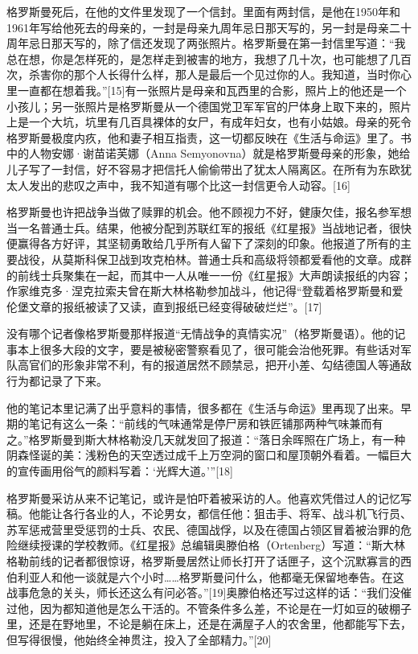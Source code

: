 格罗斯曼死后，在他的文件里发现了一个信封。里面有两封信，是他在1950年和1961年写给他死去的母亲的，一封是母亲九周年忌日那天写的，另一封是母亲二十周年忌日那天写的，除了信还发现了两张照片。格罗斯曼在第一封信里写道：“我总在想，你是怎样死的，是怎样走到被害的地方，我想了几十次，也可能想了几百次，杀害你的那个人长得什么样，那人是最后一个见过你的人。我知道，当时你心里一直都在想着我。”[15]有一张照片是母亲和瓦西里的合影，照片上的他还是一个小孩儿；另一张照片是格罗斯曼从一个德国党卫军军官的尸体身上取下来的，照片上是一个大坑，坑里有几百具裸体的女尸，有成年妇女，也有小姑娘。母亲的死令格罗斯曼极度内疚，他和妻子相互指责，这一切都反映在《生活与命运》里了。书中的人物安娜·谢苗诺芙娜（Anna Semyonovna）就是格罗斯曼母亲的形象，她给儿子写了一封信，好不容易才把信托人偷偷带出了犹太人隔离区。在所有为东欧犹太人发出的悲叹之声中，我不知道有哪个比这一封信更令人动容。[16]

格罗斯曼也许把战争当做了赎罪的机会。他不顾视力不好，健康欠佳，报名参军想当一名普通士兵。结果，他被分配到苏联红军的报纸《红星报》当战地记者，很快便赢得各方好评，其坚韧勇敢给几乎所有人留下了深刻的印象。他报道了所有的主要战役，从莫斯科保卫战到攻克柏林。普通士兵和高级将领都爱看他的文章。成群的前线士兵聚集在一起，而其中一人从唯一一份《红星报》大声朗读报纸的内容；作家维克多·涅克拉索夫曾在斯大林格勒参加战斗，他记得“登载着格罗斯曼和爱伦堡文章的报纸被读了又读，直到报纸已经变得破破烂烂”。[17]

没有哪个记者像格罗斯曼那样报道“无情战争的真情实况”（格罗斯曼语）。他的记事本上很多大段的文字，要是被秘密警察看见了，很可能会治他死罪。有些话对军队高官们的形象非常不利，有的报道居然不顾禁忌，把开小差、勾结德国人等通敌行为都记录了下来。

他的笔记本里记满了出乎意料的事情，很多都在《生活与命运》里再现了出来。早期的笔记有这么一条：“前线的气味通常是停尸房和铁匠铺那两种气味兼而有之。”格罗斯曼到斯大林格勒没几天就发回了报道：“落日余晖照在广场上，有一种阴森怪诞的美：浅粉色的天空透过成千上万空洞的窗口和屋顶朝外看着。一幅巨大的宣传画用俗气的颜料写着：‘光辉大道。’”[18]

格罗斯曼采访从来不记笔记，或许是怕吓着被采访的人。他喜欢凭借过人的记忆写稿。他能让各行各业的人，不论男女，都信任他：狙击手、将军、战斗机飞行员、苏军惩戒营里受惩罚的士兵、农民、德国战俘，以及在德国占领区冒着被治罪的危险继续授课的学校教师。《红星报》总编辑奥滕伯格（Ortenberg）写道：“斯大林格勒前线的记者都很惊讶，格罗斯曼居然让师长打开了话匣子，这个沉默寡言的西伯利亚人和他一谈就是六个小时……格罗斯曼问什么，他都毫无保留地奉告。在这战事危急的关头，师长还这么有问必答。”[19]奥滕伯格还写过这样的话：“我们没催过他，因为都知道他是怎么干活的。不管条件多么差，不论是在一灯如豆的破棚子里，还是在野地里，不论是躺在床上，还是在满屋子人的农舍里，他都能写下去，但写得很慢，他始终全神贯注，投入了全部精力。”[20]

